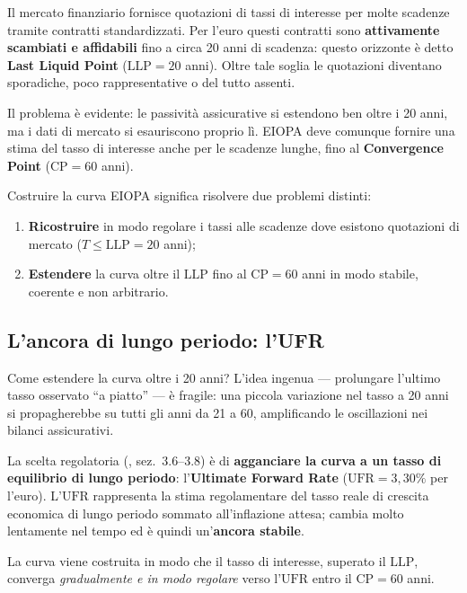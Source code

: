 \documentclass[11pt,a4paper]{article}
\theoremstyle{plain}
\theoremstyle{definition}
\theoremstyle{remark}
\newcommand{\UFR}{\ensuremath{\mathrm{UFR}}}
\newcommand{\LLP}{\ensuremath{\mathrm{LLP}}}
\newcommand{\CP}{\ensuremath{\mathrm{CP}}}
\begin{document}
Il mercato finanziario fornisce quotazioni di tassi di interesse per molte scadenze tramite
contratti standardizzati. Per l'euro questi contratti sono \textbf{attivamente scambiati e
affidabili} fino a circa 20 anni di scadenza: questo orizzonte \`e detto
\textbf{Last Liquid Point} ($\LLP = 20$ anni). Oltre tale soglia le quotazioni diventano
sporadiche, poco rappresentative o del tutto assenti.

Il problema \`e evidente: le passivit\`a assicurative si estendono ben oltre i 20 anni,
ma i dati di mercato si esauriscono proprio l\`i. EIOPA deve comunque fornire una stima
del tasso di interesse anche per le scadenze lunghe, fino al \textbf{Convergence Point}
($\CP = 60$ anni).

\begin{keybox}
Costruire la curva EIOPA significa risolvere due problemi distinti:
\begin{enumerate}
  \item \textbf{Ricostruire} in modo regolare i tassi alle scadenze dove esistono
        quotazioni di mercato ($T \le \LLP = 20$ anni);
  \item \textbf{Estendere} la curva oltre il $\LLP$ fino al $\CP = 60$ anni in modo
        stabile, coerente e non arbitrario.
\end{enumerate}
\end{keybox}

\subsection{L'ancora di lungo periodo: l'UFR}

Come estendere la curva oltre i 20 anni? L'idea ingenua --- prolungare l'ultimo tasso
osservato ``a piatto'' --- \`e fragile: una piccola variazione nel tasso a 20 anni si
propagherebbe su tutti gli anni da 21 a 60, amplificando le oscillazioni nei bilanci
assicurativi.

La scelta regolatoria (\cite{eiopa2025}, sez.~3.6--3.8) \`e di \textbf{agganciare la curva
a un tasso di equilibrio di lungo periodo}: l'\textbf{Ultimate Forward Rate}
($\UFR = 3{,}30\%$ per l'euro). L'$\UFR$ rappresenta la stima regolamentare del tasso
reale di crescita economica di lungo periodo sommato all'inflazione attesa; cambia molto
lentamente nel tempo ed \`e quindi un'\textbf{ancora stabile}.

La curva viene costruita in modo che il tasso di interesse, superato il $\LLP$, converga
\emph{gradualmente e in modo regolare} verso l'$\UFR$ entro il $\CP = 60$ anni.
\end{document}
